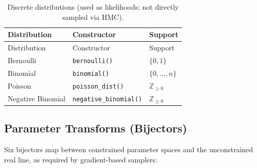 \documentclass[
  11pt,
]{article}
\begin{document}
\begin{longtable}[]{@{}
  >{\raggedright\arraybackslash}p{}
  >{\raggedright\arraybackslash}p{}
  >{\raggedright\arraybackslash}p{}@{}}
\caption{Discrete distributions (used as likelihoods; not directly
sampled via HMC).}\tabularnewline
\toprule\noalign{}
\begin{minipage}[b]{\linewidth}\raggedright
Distribution
\end{minipage} & \begin{minipage}[b]{\linewidth}\raggedright
Constructor
\end{minipage} & \begin{minipage}[b]{\linewidth}\raggedright
Support
\end{minipage} \\
\midrule\noalign{}
\endfirsthead
\toprule\noalign{}
\begin{minipage}[b]{\linewidth}\raggedright
Distribution
\end{minipage} & \begin{minipage}[b]{\linewidth}\raggedright
Constructor
\end{minipage} & \begin{minipage}[b]{\linewidth}\raggedright
Support
\end{minipage} \\
\midrule\noalign{}
\endhead
\bottomrule\noalign{}
\endlastfoot
Bernoulli & \texttt{bernoulli()} & \(\{0,1\}\) \\
Binomial & \texttt{binomial()} & \(\{0,\ldots,n\}\) \\
Poisson & \texttt{poisson\_dist()} & \(\mathbb{Z}_{\geq 0}\) \\
Negative Binomial & \texttt{negative\_binomial()} &
\(\mathbb{Z}_{\geq 0}\) \\
\end{longtable}

\subsection{Parameter Transforms
(Bijectors)}\label{parameter-transforms-bijectors}

Six bijectors map between constrained parameter spaces and the
unconstrained real line, as required by gradient-based samplers:
\end{document}
